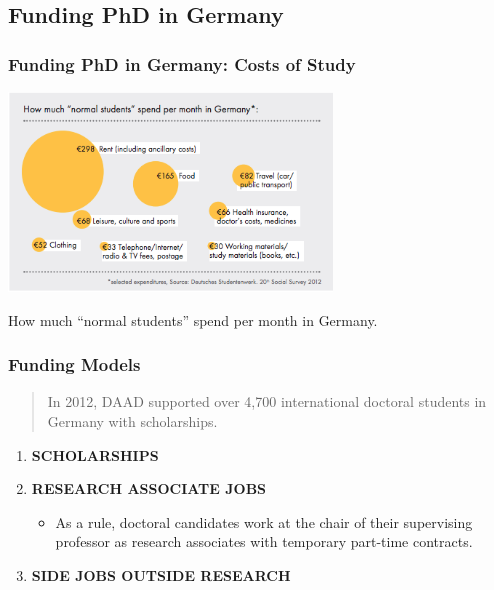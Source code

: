\documentclass[9pt, compress]{beamer}
\begin{document}
	\subsection{Funding PhD in Germany}
	\begin{frame} 
		\frametitle{Funding PhD in Germany: Costs of Study}
		\includegraphics[width=\textwidth,height=150pt]{img/cost.png}
		\begin{center}
			How much “normal students” spend per month in Germany.
		\end{center}
	\end{frame}
	\begin{frame} 
		\frametitle{Funding Models}
	\begin{quotation}
		In 2012, DAAD supported over 4,700 international doctoral students in Germany with scholarships.
	\end{quotation}
		\begin{enumerate}
			\setcounter{enumi}{0}
			\item \textbf{SCHOLARSHIPS}
			\item \textbf{RESEARCH ASSOCIATE JOBS}
			\begin{itemize}
				\item As a rule, doctoral candidates work at the chair of their supervising professor as research associates with temporary part-time contracts.
			\end{itemize}
			\item  \textbf{SIDE JOBS OUTSIDE RESEARCH}
		\end{enumerate} 
	\end{frame}
\end{document}
